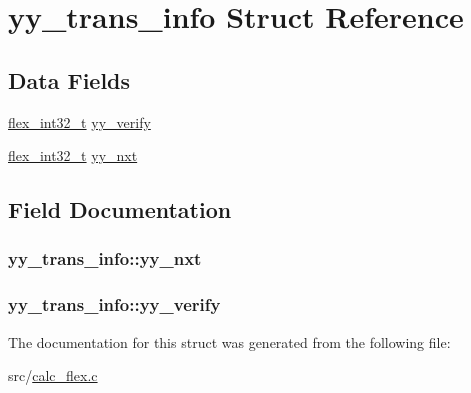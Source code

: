 \hypertarget{structyy__trans__info}{}\section{yy\+\_\+trans\+\_\+info Struct Reference}
\label{structyy__trans__info}
\subsection*{Data Fields}
\begin{DoxyCompactItemize}
\item 
\hyperlink{calc__flex_8c_a838ce943cf44ef7769480714fc6c3ba9}{flex\+\_\+int32\+\_\+t} \hyperlink{structyy__trans__info_a5c9f61e770deef50bd4e697310342fe9}{yy\+\_\+verify}
\item 
\hyperlink{calc__flex_8c_a838ce943cf44ef7769480714fc6c3ba9}{flex\+\_\+int32\+\_\+t} \hyperlink{structyy__trans__info_ae0715250c2bef261e596e77e0030f13e}{yy\+\_\+nxt}
\end{DoxyCompactItemize}


\subsection{Field Documentation}
\hypertarget{structyy__trans__info_ae0715250c2bef261e596e77e0030f13e}{}
\subsubsection[{yy\+\_\+nxt}]{ yy\+\_\+trans\+\_\+info\+::yy\+\_\+nxt}\label{structyy__trans__info_ae0715250c2bef261e596e77e0030f13e}
\hypertarget{structyy__trans__info_a5c9f61e770deef50bd4e697310342fe9}{}
\subsubsection[{yy\+\_\+verify}]{ yy\+\_\+trans\+\_\+info\+::yy\+\_\+verify}\label{structyy__trans__info_a5c9f61e770deef50bd4e697310342fe9}


The documentation for this struct was generated from the following file\+:\begin{DoxyCompactItemize}
\item 
src/\hyperlink{calc__flex_8c}{calc\+\_\+flex.\+c}\end{DoxyCompactItemize}
